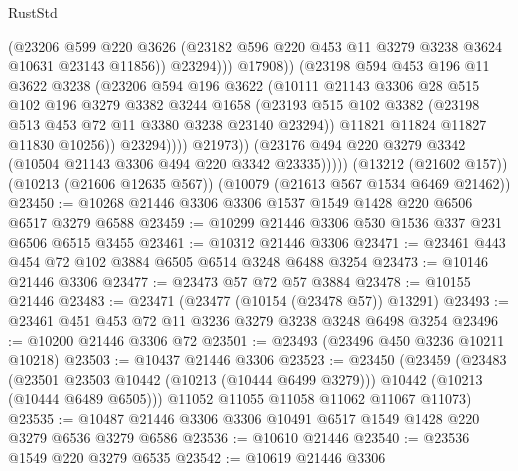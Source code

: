 \begin{lexlean}{RustStd}
\begin{coremodule}
{\begin{coremodule}
{{{{{{{{{{{{{{{{{{{{{{{{{{                              (@23206
                                @599
                                @220
                                @3626
                                (@23182 @596 @220 @453 @11 @3279 @3238 @3624 @10631 @23143 @11856))
                              @23294)))
                        @17908))
                    (@23198
                      @594
                      @453
                      @196
                      @11
                      @3622
                      @3238
                      (@23206
                        @594
                        @196
                        @3622
                        (@10111
                          @21143
                          @3306
                          @28
                          @515
                          @102
                          @196
                          @3279
                          @3382
                          @3244
                          @1658
                          (@23193
                            @515
                            @102
                            @3382
                            (@23198 @513 @453 @72 @11 @3380 @3238 @23140 @23294))
                          @11821
                          @11824
                          @11827
                          @11830
                          @10256))
                      @23294))))
              @21973))
          (@23176 @494 @220 @3279 @3342 (@10504 @21143 @3306 @494 @220 @3342 @23335)))))
    (@13212 (@21602 @157))
    (@10213 (@21606 @12635 @567))
    (@10079 (@21613 @567 @1534 @6469 @21462))
@23450 := @10268 @21446 @3306 @3306 @1537 @1549 @1428 @220 @6506 @6517 @3279 @6588
@23459 := @10299 @21446 @3306 @530 @1536 @337 @231 @6506 @6515 @3455
@23461 := @10312 @21446 @3306
@23471 := @23461 @443 @454 @72 @102 @3884 @6505 @6514 @3248 @6488 @3254
@23473 := @10146 @21446 @3306
@23477 := @23473 @57 @72 @57 @3884
@23478 := @10155 @21446
@23483 := @23471 (@23477 (@10154 (@23478 @57)) @13291)
@23493 := @23461 @451 @453 @72 @11 @3236 @3279 @3238 @3248 @6498 @3254
@23496 := @10200 @21446 @3306 @72
@23501 := @23493 (@23496 @450 @3236 @10211 @10218)
@23503 := @10437 @21446 @3306
@23523 := @23450
    (@23459
      (@23483
        (@23501 @23503 @10442 (@10213 (@10444 @6499 @3279)))
        @10442
        (@10213 (@10444 @6489 @6505)))
      @11052
      @11055
      @11058
      @11062
      @11067
      @11073)
@23535 := @10487 @21446 @3306 @3306 @10491 @6517 @1549 @1428 @220 @3279 @6536 @3279 @6586
@23536 := @10610 @21446
@23540 := @23536 @1549 @220 @3279 @6535
@23542 := @10619 @21446 @3306
}}}}}}}}}}}}}}}}}}}}}}}}}}
\end{coremodule}}
\end{coremodule}
\end{lexlean}

